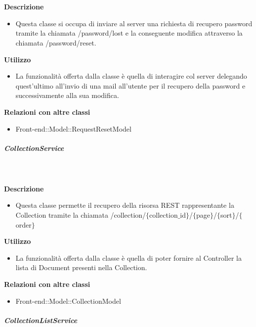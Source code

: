 				\textbf{\\ \\ Descrizione} 
					\begin{itemize}
						\item[] Questa classe si occupa di inviare al server una richiesta di recupero password tramite la chiamata /password/lost e la conseguente modifica attraverso la chiamata /password/reset.
					\end{itemize}      
				\textbf{Utilizzo}  
					\begin{itemize}
						\item[] La  funzionalità offerta dalla classe è quella di interagire col server delegando quest'ultimo all'invio di una mail all'utente per il recupero della password e successivamente alla sua modifica.
					\end{itemize}
					\textbf{Relazioni con altre classi}
					\begin{itemize}
							\item{Front-end::Model::RequestResetModel}
					\end{itemize}
			\subparagraph{CollectionService}
				
				\textbf{\\ \\ Descrizione} 
					\begin{itemize}
						\item[] Questa classe permette il recupero della risorsa REST rappresentante la Collection tramite la chiamata  /collection/$\{$collection$\_$id$\}$/$\{$page$\}$/$\{$sort$\}$/$\{$order$\}$
					\end{itemize}      
				\textbf{Utilizzo}  
					\begin{itemize}
						\item[] La  funzionalità offerta dalla classe è quella di poter fornire al Controller la lista di Document presenti nella Collection.
					\end{itemize}
					\textbf{Relazioni con altre classi}
					\begin{itemize}
							\item{Front-end::Model::CollectionModel}
					\end{itemize}
			\subparagraph{CollectionListService}
				
